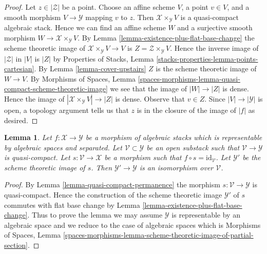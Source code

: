\documentclass{stacks-project}
\theoremstyle{plain}
\newtheorem{lemma}[subsection]{Lemma}
\theoremstyle{definition}
\theoremstyle{remark}
\numberwithin{equation}{subsection}
\begin{document}
\begin{proof}
Let $z \in |\mathcal{Z}|$ be a point.
Choose an affine scheme $V$, a point $v \in V$, and a smooth morphism
$V \to \mathcal{Y}$ mapping $v$ to $z$.
Then $\mathcal{X} \times_\mathcal{Y} V$ is a quasi-compact algebraic stack.
Hence we can find an affine scheme $W$ and a surjective smooth
morphism $W \to \mathcal{X} \times_\mathcal{Y} V$.
By Lemma \ref{lemma-existence-plus-flat-base-change}
the scheme theoretic image of
$\mathcal{X} \times_\mathcal{Y} V \to V$ is
$Z = \mathcal{Z} \times_\mathcal{Y} V$.
Hence the inverse image of $|\mathcal{Z}|$ in $|V|$ is $|Z|$ by
Properties of Stacks, Lemma \ref{stacks-properties-lemma-points-cartesian}.
By Lemma \ref{lemma-cover-upstairs} $Z$ is
the scheme theoretic image of $W \to V$.
By Morphisms of Spaces, Lemma
\ref{spaces-morphisms-lemma-quasi-compact-scheme-theoretic-image}
we see that the image of $|W| \to |Z|$ is dense.
Hence the image of $|\mathcal{X} \times_\mathcal{Y} V| \to |Z|$
is dense. Observe that $v \in Z$.
Since $|V| \to |\mathcal{Y}|$ is open, a topology argument
tells us that $z$ is in the closure of the image of $|f|$ as desired.
\end{proof}

\begin{lemma}
\label{lemma-scheme-theoretic-image-of-partial-section}
Let $f : \mathcal{X} \to \mathcal{Y}$ be a morphism of algebraic stacks
which is representable by algebraic spaces and separated.
Let $\mathcal{V} \subset \mathcal{Y}$ be an open substack such that
$\mathcal{V} \to \mathcal{Y}$ is quasi-compact.
Let $s : \mathcal{V} \to \mathcal{X}$ be a morphism such that
$f \circ s = \text{id}_\mathcal{V}$.
Let $\mathcal{Y}'$ be the scheme theoretic image of $s$.
Then $\mathcal{Y}' \to \mathcal{Y}$ is an isomorphism over $\mathcal{V}$.
\end{lemma}

\begin{proof}
By Lemma \ref{lemma-quasi-compact-permanence}
the morphism $s : \mathcal{V} \to \mathcal{Y}$ is quasi-compact.
Hence the construction of the scheme theoretic image $\mathcal{Y}'$
of $s$ commutes with flat base change by
Lemma \ref{lemma-existence-plus-flat-base-change}.
Thus to prove the lemma
we may assume $\mathcal{Y}$ is representable by an algebraic space
and we reduce to the case of algebraic spaces which is
Morphisms of Spaces, Lemma
\ref{spaces-morphisms-lemma-scheme-theoretic-image-of-partial-section}.
\end{proof}
\end{document}
